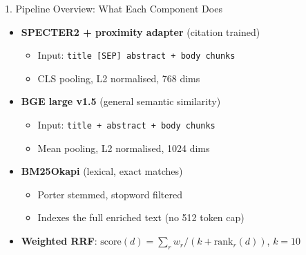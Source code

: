 \documentclass[aspectratio=169, 12pt]{beamer}
\begin{document}
\begin{frame}{1. Pipeline Overview: What Each Component Does}
\begin{itemize}
    \item \textbf{SPECTER2 + proximity adapter} (citation trained)
    \begin{itemize}
        \item \small Input: \texttt{title [SEP] abstract + body chunks}
        \item \small CLS pooling, L2 normalised, 768 dims
    \end{itemize}
    \vspace{0.3em}
    \item \textbf{BGE large v1.5} (general semantic similarity)
    \begin{itemize}
        \item \small Input: \texttt{title + abstract + body chunks}
        \item \small Mean pooling, L2 normalised, 1024 dims
    \end{itemize}
    \vspace{0.3em}
    \item \textbf{BM25Okapi} (lexical, exact matches)
    \begin{itemize}
        \item \small Porter stemmed, stopword filtered
        \item \small Indexes the full enriched text (no 512 token cap)
    \end{itemize}
    \vspace{0.3em}
    \item \textbf{Weighted RRF}: $\text{score}(d) = \sum_r w_r / (k + \text{rank}_r(d))$, $k=10$
\end{itemize}
\end{frame}
\end{document}
